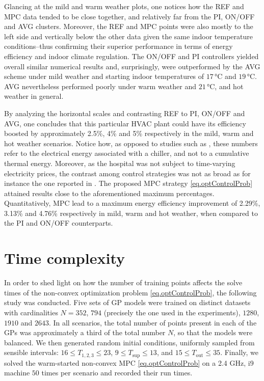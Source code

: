 Glancing at the mild and warm weather plots, one notices how the REF and MPC data tended to be close together, and relatively far from the PI, ON/OFF and AVG clusters. Moreover, the REF and MPC points were also mostly to the left side and vertically below the other data given the same indoor temperature conditions--thus confirming their superior performance in terms of energy efficiency and indoor climate regulation. The ON/OFF and PI controllers yielded overall similar numerical results and, surprisingly, were outperformed by the AVG scheme under mild weather and starting indoor temperatures of $17\,$°C and $19\,$°C. AVG nevertheless performed poorly under warm weather and $21\,$°C, and hot weather in general. 

By analyzing the horizontal scales and contrasting REF to PI, ON/OFF and AVG, one concludes that this particular HVAC plant could have its efficiency boosted by approximately 2.5\%, 4\% and 5\% respectively in the mild, warm and hot weather scenarios. Notice how, as opposed to studies such as \cite{bunning2020experimental}, these numbers refer to the electrical energy associated with a chiller, and not to a cumulative thermal energy. Moreover, as the hospital was not subject to time-varying electricity prices, the contrast among control strategies was not as broad as for instance the one reported in \cite{joe2022investigation}. The proposed MPC strategy \eqref{eq.optControlProb} attained results close to the aforementioned maximum percentages. Quantitatively, MPC lead to a maximum energy efficiency improvement of 2.29\%, 3.13\% and 4.76\% respectively in mild, warm and hot weather, when compared to the PI and ON/OFF counterparts.

\section{Time complexity}


In order to shed light on how the number of training points affects the solve times of the non-convex optimization problem \eqref{eq.optControlProb}, the following study was conducted. Five sets of GP models were trained on distinct datasets with cardinalities $N = 352$, $794$ (precisely the one used in the experiments), $1280$, $1910$ and $2643$. In all scenarios, the total number of points present in each of the GPs was approximately a third of the total number $N$, so that the models were balanced. We then generated random initial conditions, uniformly sampled from sensible intervals: $16 \leq T_{1,2,3} \leq 23$, $9 \leq T_\text{sup} \leq 13$, and $15 \leq T_\text{out} \leq 35$. Finally, we solved the warm-started non-convex MPC \eqref{eq.optControlProb} on a 2.4 GHz, i9 machine $50$ times per scenario and recorded their run times. 

